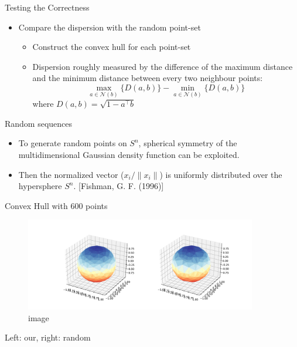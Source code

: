 \begin{frame}{Testing the Correctness}
\protect\hypertarget{testing-the-correctness}{}

\begin{itemize}
\item
  Compare the dispersion with the random point-set

  \begin{itemize}
  \item
    Construct the convex hull for each point-set
  \item
    Dispersion roughly measured by the difference of the maximum
    distance and the minimum distance between every two neighbour
    points: \[\max_{a \in \mathcal{N}(b)} \{D(a,b)\} - 
            \min_{a \in \mathcal{N}(b)} \{ D(a, b) \}\] where
    \(D(a,b) = \sqrt{1 - a^\top b}\)
  \end{itemize}
\end{itemize}

\end{frame}

\begin{frame}{Random sequences}
\protect\hypertarget{random-sequences}{}

\begin{itemize}
\item
  To generate random points on \(S^n\), spherical symmetry of the
  multidimensional Gaussian density function can be exploited.
\item
  Then the normalized vector (\(x_i/\|x_i\|\)) is uniformly distributed
  over the hypersphere \(S^n\). {[}Fishman, G. F. (1996){]}
\end{itemize}

\end{frame}

\begin{frame}{Convex Hull with \(600\) points}
\protect\hypertarget{convex-hull-with-600-points}{}

\begin{figure}
\centering
\includegraphics[width=0.9\textwidth,height=\textheight]{res_compare.pdf}
\caption{image}
\end{figure}

Left: our, right: random

\end{frame}

